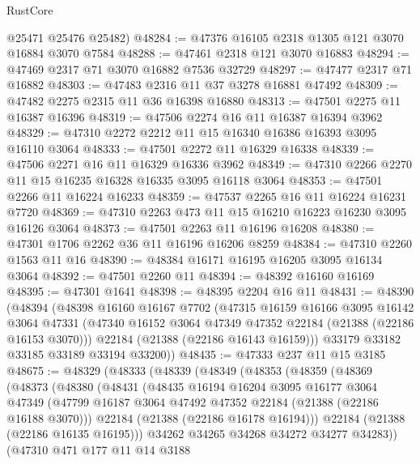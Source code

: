 \begin{lexlean}{RustCore}
\begin{coremodule}
      @25471
      @25476
      @25482)
@48284 := @47376 @16105 @2318 @1305 @121 @3070 @16884 @3070 @7584
@48288 := @47461 @2318 @121 @3070 @16883
@48294 := @47469 @2317 @71 @3070 @16882 @7536 @32729
@48297 := @47477 @2317 @71 @16882
@48303 := @47483 @2316 @11 @37 @3278 @16881 @47492
@48309 := @47482 @2275 @2315 @11 @36 @16398 @16880
@48313 := @47501 @2275 @11 @16387 @16396
@48319 := @47506 @2274 @16 @11 @16387 @16394 @3962
@48329 := @47310 @2272 @2212 @11 @15 @16340 @16386 @16393 @3095 @16110 @3064
@48333 := @47501 @2272 @11 @16329 @16338
@48339 := @47506 @2271 @16 @11 @16329 @16336 @3962
@48349 := @47310 @2266 @2270 @11 @15 @16235 @16328 @16335 @3095 @16118 @3064
@48353 := @47501 @2266 @11 @16224 @16233
@48359 := @47537 @2265 @16 @11 @16224 @16231 @7720
@48369 := @47310 @2263 @473 @11 @15 @16210 @16223 @16230 @3095 @16126 @3064
@48373 := @47501 @2263 @11 @16196 @16208
@48380 := @47301 @1706 @2262 @36 @11 @16196 @16206 @8259
@48384 := @47310 @2260 @1563 @11 @16
@48390 := @48384 @16171 @16195 @16205 @3095 @16134 @3064
@48392 := @47501 @2260 @11
@48394 := @48392 @16160 @16169
@48395 := @47301 @1641
@48398 := @48395 @2204 @16 @11
@48431 := @48390
    (@48394
      (@48398
        @16160
        @16167
        @7702
        (@47315
          @16159
          @16166
          @3095
          @16142
          @3064
          @47331
          (@47340 @16152 @3064 @47349 @47352 @22184 (@21388 (@22186 @16153 @3070)))
          @22184
          (@21388 (@22186 @16143 @16159)))
        @33179
        @33182
        @33185
        @33189
        @33194
        @33200))
@48435 := @47333 @237 @11 @15 @3185
@48675 := @48329
    (@48333
      (@48339
        (@48349
          (@48353
            (@48359
              (@48369
                (@48373
                  (@48380
                    (@48431
                      (@48435
                        @16194
                        @16204
                        @3095
                        @16177
                        @3064
                        @47349
                        (@47799 @16187 @3064 @47492 @47352 @22184 (@21388 (@22186 @16188 @3070)))
                        @22184
                        (@21388 (@22186 @16178 @16194)))
                      @22184
                      (@21388 (@22186 @16135 @16195)))
                    @34262
                    @34265
                    @34268
                    @34272
                    @34277
                    @34283))
                (@47310
                  @471
                  @177
                  @11
                  @14
                  @3188

\end{coremodule}
\end{lexlean}

